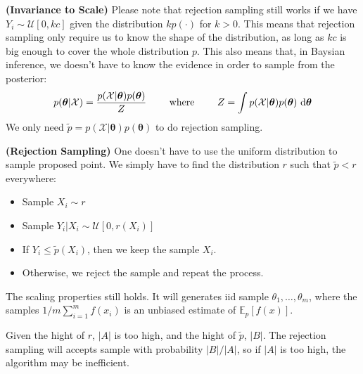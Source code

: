 \begin{remark}{\textbf{(Invariance to Scale)}}
    Please note that rejection sampling still works if we have $Y_i\sim\mathcal{U}[0, kc]$ given the distribution $kp(\cdot)$ for $k>0$. This means that rejection sampling only require us to know the shape of the distribution, as long as $kc$ is big enough to cover the whole distribution $p$. This also means that, in Baysian inference, we doesn't have to know the evidence in order to sample from the posterior:
    \begin{equation*}
        p(\boldsymbol \theta | \mathcal{X}) = \frac{p(\mathcal{X}|\boldsymbol \theta)p(\boldsymbol \theta)}{Z} \qquad \text{ where } \qquad Z = \int p(\mathcal{X}|\boldsymbol \theta) p(\boldsymbol \theta)\ \mathrm{d} \boldsymbol \theta 
    \end{equation*}
    We only need $\tilde{p} = p(\mathcal{X}|\boldsymbol \theta)p(\boldsymbol \theta)$ to do rejection sampling. 
\end{remark}

\begin{definition}{\textbf{(Rejection Sampling)}}
    One doesn't have to use the uniform distribution to sample proposed point. We simply have to find the distribution $r$ such that $\tilde{p} < r$ everywhere:
    \begin{itemize}
        \item Sample $X_i \sim r$
        \item Sample $Y_i | X_i \sim \mathcal{U}[0, r(X_i)]$
        \item If $Y_i \le \tilde{p}(X_i)$, then we keep the sample $X_i$.
        \item Otherwise, we reject the sample and repeat the process. 
    \end{itemize} 
    The scaling properties still holds. It will generates iid sample $\theta_1,\dots,\theta_m$, where the samples $1/m\sum^m_{i=1}f(x_i)$ is an unbiased estimate of $\mathbb{E}_p[f(x)]$. 
\end{definition}

\begin{remark}
    Given the hight of $r$, $|A|$ is too high, and the hight of $\tilde{p}$, $|B|$. The rejection sampling will accepts sample with probability $|B|/|A|$, so if $|A|$ is too high, the algorithm may be inefficient. 
\end{remark}

